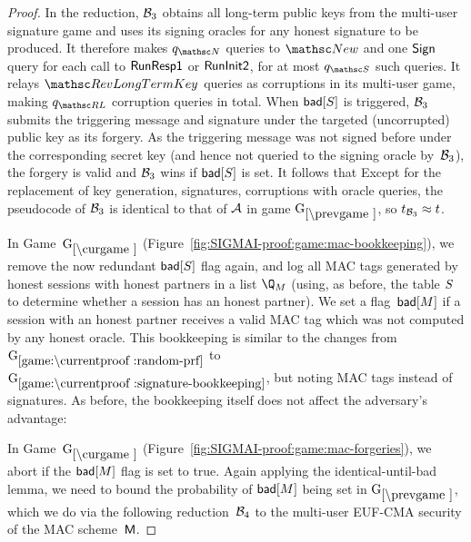 \begin{proof}
\iffull %
\SIGMIProofSignatureMAC
\fi

In the reduction, $\advB_3$ obtains all long-term public keys from the multi-user signature game and uses its signing oracles for any honest signature to be produced. It therefore makes $\qNewUser$ queries to $\New$ and one $\SIGSign$ query for each call to $\RunRespI$ or $\RunInit$, for at most $\qSend$ such queries.
It relays $\RevLongTermKey$ queries as corruptions in its multi-user game, making $\qRevLongTermKey$ corruption queries in total. 
When $\bad[S]$ is triggered, $\advB_3$ submits the triggering message and signature under the targeted (uncorrupted) public key as its forgery.
As the triggering message was not signed before under the corresponding secret key (and hence not queried to the signing oracle by~$\advB_3$), the forgery is valid and $\advB_3$ wins if $\bad[S]$ is set.
It follows that
Except for the replacement of key generation, signatures, corruptions with oracle queries, the pseudocode of $\advB_3$ is identical to that of $\advA$ in game $\prevGm*$, so $t_{\advB_3} \approx t$. 


In Game~$\curGm$ (Figure~\ref{fig:SIGMAI-proof:game:mac-bookkeeping}), we remove the now redundant $\bad[S]$ flag again,
and log all MAC tags generated by honest sessions with honest partners in a list $\Q_{M}$ (using, as before, the table $\S$ to determine whether a session has an honest partner).
We set a flag~$\bad[M]$ if a session with an honest partner receives a valid MAC tag which was not computed by any honest oracle. 
This bookkeeping is similar to the changes from $\lblGm{random-prf}$ to $\lblGm{signature-bookkeeping}$, but noting MAC tags instead of signatures.
As before, the bookkeeping itself does not affect the adversary's advantage:



In Game~$\curGm$ (Figure~\ref{fig:SIGMAI-proof:game:mac-forgeries}), we abort if the $\bad[M]$ flag is set to true.
Again applying the identical-until-bad lemma, we need to bound the probability of $\bad[M]$ being set in $\prevGm$,
which we do via the following reduction~$\advB_4$ to the multi-user EUF-CMA security of the MAC scheme~$\MACScheme$.%


\end{proof}

